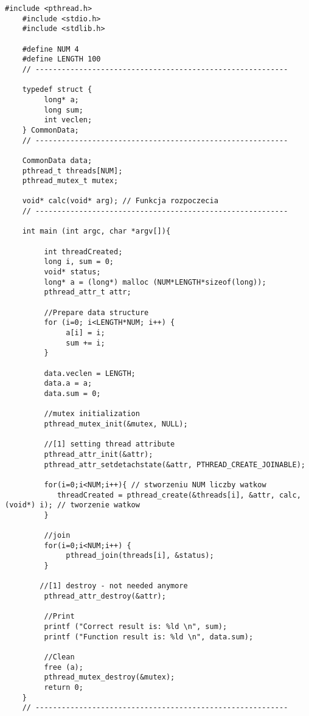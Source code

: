 \documentclass[a4paper,15pt]{article}
\begin{document}
\begin{lstlisting}[style=CStyle, label=some-code, caption=Zadanie 3 - func.c]
 #include <pthread.h>
    #include <stdio.h>
    #include <stdlib.h>
     
    #define NUM 4
    #define LENGTH 100
    // ----------------------------------------------------------
     
    typedef struct {
         long* a;
         long sum; 
         int veclen; 
    } CommonData;
    // ----------------------------------------------------------
     
    CommonData data; 
    pthread_t threads[NUM];
    pthread_mutex_t mutex;
     
    void* calc(void* arg); // Funkcja rozpoczecia
    // ----------------------------------------------------------
     
    int main (int argc, char *argv[]){
     
         int threadCreated;
         long i, sum = 0;
         void* status;
         long* a = (long*) malloc (NUM*LENGTH*sizeof(long));     
         pthread_attr_t attr;
     
         //Prepare data structure
         for (i=0; i<LENGTH*NUM; i++) {
              a[i] = i;
              sum += i;
         }
     
         data.veclen = LENGTH; 
         data.a = a; 
         data.sum = 0;
     
         //mutex initialization
         pthread_mutex_init(&mutex, NULL);
     
         //[1] setting thread attribute
         pthread_attr_init(&attr);
         pthread_attr_setdetachstate(&attr, PTHREAD_CREATE_JOINABLE);
     
         for(i=0;i<NUM;i++){ // stworzeniu NUM liczby watkow
            threadCreated = pthread_create(&threads[i], &attr, calc, (void*) i); // tworzenie watkow
         }
     
         //join
         for(i=0;i<NUM;i++) {
              pthread_join(threads[i], &status);
         }

        //[1] destroy - not needed anymore
         pthread_attr_destroy(&attr);
     
         //Print
         printf ("Correct result is: %ld \n", sum);
         printf ("Function result is: %ld \n", data.sum);
     
         //Clean
         free (a);
         pthread_mutex_destroy(&mutex);
         return 0;
    }
    // ----------------------------------------------------------
     

\end{lstlisting}
\end{document}
